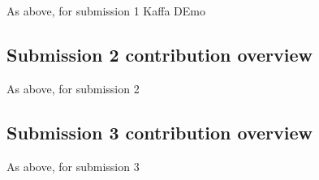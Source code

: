 \documentclass[a4paper, 11pt]{report}
\begin{document}
As above, for submission 1 Kaffa DEmo

\subsection{Submission 2 contribution overview}

As above, for submission 2

\subsection{Submission 3 contribution overview}

As above, for submission 3 



\newpage



\end{document}
